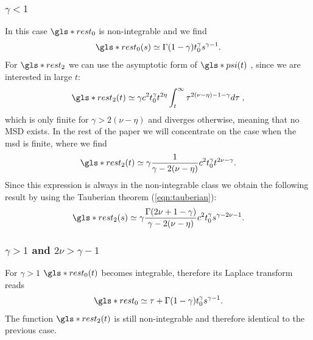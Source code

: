 \subsubsection{$\gamma<1 $ }
In this case $\gls*{rest}_0$ is non-integrable and we find
\begin{equation}
  \gls*{rest}_0(s) \simeq  \Gamma(1-\gamma) t_0^\gamma s^{\gamma-1}.
\end{equation}
For $\gls*{rest}_2$  we can use the asymptotic form of $\gls*{psi}(t)$ , since we are interested in large $t$:
\begin{equation}
\gls*{rest}_2(t) \simeq \gamma c^2 t_0^\gamma t^{2\eta} \int_t^\infty \tau^{2(\nu-\eta)-1-\gamma}  d\tau   \; , 
\end{equation}
which is only finite for $\gamma > 2(\nu-\eta)$ and diverges otherwise, meaning that no MSD exists. In the rest of 
the paper we will concentrate on the case when the \gls*{msd} is finite, where we find
\begin{equation}
\gls*{rest}_{2}(t)  \simeq \gamma\frac{1} {\gamma - 2(\nu-\eta)} c^2 t_0^\gamma t^{2\nu -\gamma}  .
\end{equation}
Since this expression is always in the non-integrable class we obtain the following result by using the Tauberian theorem (\ref{eqn:tauberian}):
\begin{equation}
\gls*{rest}_2(s) \simeq \gamma  \frac{ \Gamma(2\nu+1-\gamma)}{\gamma - 2(\nu-\eta)}c^2 t_0^\gamma s^{\gamma - 2\nu-1}.
\end{equation}

\subsubsection{$\gamma>1$ and $2\nu>\gamma-1$}
For $\gamma>1$ $\gls*{rest}_0(t)$ becomes integrable, therefore its Laplace transform reads
\begin{equation}
 \gls*{rest}_0 \simeq \tau + \Gamma(1-\gamma) t_0^\gamma s^{\gamma-1} .
\end{equation}
The function $\gls*{rest}_2(t)$ is still non-integrable and therefore identical to the previous case.

